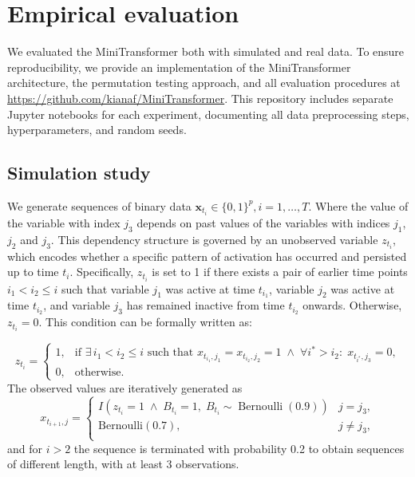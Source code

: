 \documentclass[AMA,Times1COL]{WileyNJDv5} %
\begin{document}
\section{Empirical evaluation}\label{sec:experiments}

We evaluated the MiniTransformer both with simulated and real data. To ensure reproducibility, we provide an implementation of the MiniTransformer architecture, the permutation testing approach, and all evaluation procedures at \url{https://github.com/kianaf/MiniTransformer}. This repository includes separate Jupyter notebooks for each experiment, documenting all data preprocessing steps, hyperparameters, and random seeds.

\subsection{Simulation study}\label{sec:simulation_experiments}

We generate sequences of binary data $\mathbf{x}_{t_i} \in \{0,1\}^{p}, i=1,\ldots,T$. Where the value of the variable with index $j_3$ depends on past values of the variables with indices $j_1$, $j_2$ and $j_3$. This dependency structure is governed by an unobserved variable $z_{t_i}$, which encodes whether a specific pattern of activation has occurred and persisted up to time $t_i$. Specifically, $z_{t_i}$ is set to 1 if there exists a pair of earlier time points $i_1 < i_2 \leq i$ such that variable $j_1$ was active at time $t_{i_1}$, variable $j_2$ was active at time $t_{i_2}$, and variable $j_3$ has remained inactive from time $t_{i_2}$ onwards. Otherwise, $z_{t_i} = 0$. This condition can be formally written as:

$$
z_{t_i}
=
\begin{cases}
1, &
\text{if } \exists\, i_1<i_2 \leq i 
\text{ such that }  x_{t_{i_1},j_1} = x_{t_{i_2},j_2} = 1
\;\land\;
\forall i^* > i_2:\; x_{t_{i^*},j_3} = 0, \\
0, & \text{otherwise.}
\end{cases}
$$
The observed values are iteratively generated as
$$
x_{t_{i+1},j} = 
\begin{cases}
I\left(
z_{t_i} = 1
\;\land\;
B_{t_i} = 1,\;
B_{t_i} \sim \operatorname{Bernoulli}(0.9)
\right)
& j = j_3,\\
\mathrm{Bernoulli}(0.7), &  j \neq j_3,\\
\end{cases}
$$
and for $i>2$ the sequence is terminated with probability 0.2 to obtain sequences of different length, with at least 3 observations.
\end{document}
